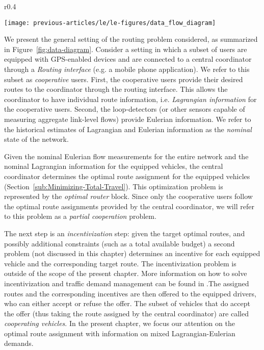 \begin{wrapfigure}{r}{0.4\columnwidth}%
\begin{centering}
\texttt{[image: previous-articles/le/le-figures/data\_flow\_diagram]}
\par\end{centering}

\protect\caption{Data-flow diagram\label{fig:data-diagram}}
\end{wrapfigure}%
We present the general setting of the routing problem considered,
as summarized in Figure~\ref{fig:data-diagram}. Consider a setting
in which a subset of users are equipped with GPS-enabled devices and
are connected to a central coordinator through a \emph{Routing interface}
(e.g. a mobile phone application). We refer to this subset as \emph{cooperative
}users. First, the cooperative users provide their desired routes
to the coordinator through the routing interface. This allows the
coordinator to have individual route information, i.e. \emph{Lagrangian
information} for the cooperative users. Second, the loop-detectors
(or other sensors capable of measuring aggregate link-level flows)
provide Eulerian information. We refer to the historical estimates
of Lagrangian and Eulerian information as the \emph{nominal} state
of the network.

Given the nominal Eulerian flow measurements for the entire network
and the nominal Lagrangian information for the equipped vehicles,
the central coordinator determines the optimal route assignment for
the equipped vehicles (Section~\ref{sub:Minimizing-Total-Travel}).
This optimization problem is represented by the \emph{optimal router}
block. Since only the cooperative users follow the optimal route assignments
provided by the central coordinator, we will refer to this problem
as a \emph{partial cooperation} problem.

The next step is an \emph{incentivization} step: given the target
optimal routes, and possibly additional constraints (such as a total
available budget) a second problem (not discussed in this chapter)
determines an incentive for each equipped vehicle and the corresponding
target route. The incentivization problem is outside of the scope
of the present chapter. More information on how to solve incentivization
and traffic demand management can be found in \cite{romain2012}.The
assigned routes and the corresponding incentives are then offered
to the equipped drivers, who can either accept or refuse the offer.
The subset of vehicles that do accept the offer (thus taking the route
assigned by the central coordinator) are called \emph{cooperating
vehicles}. In the present chapter, we focus our attention on the optimal
route assignment with information on mixed Lagrangian-Eulerian demands.

